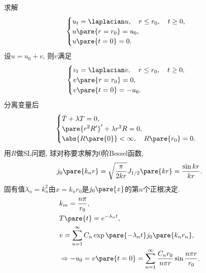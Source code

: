 \documentclass[hidelinks]{ctexart}
\begin{document}
\begin{sample}
    \begin{ex}
        求解
        \[ \begin{cases}
            u_t = \laplacian u,\quad r\le r_0,\quad t\ge 0, \\
            u\pare{r=r_0} = u_0, \\
            u\pare{t=0} = 0.
        \end{cases} \]
        设$u=u_0 + v$, 则$v$满足
        \[ \begin{cases}
            v_t = \laplacian v,\quad r\le r_0,\quad t\ge 0, \\
            v\pare{r=r_0} = 0, \\
            v\pare{t=0} = -u_0.
        \end{cases} \]
        分离变量后
        \[ \begin{cases}
            \dot{T} + \lambda T = 0, \\
            \pare{r^2R'}' + \lambda r^2 R = 0, \\
            \abs{R\pare{0}}<\infty,\quad R\pare{r_0} = 0.
        \end{cases} \]
        用$R$做SL问题, 球对称要求解为$0$阶Bessel函数,
        \[ j_0\pare{k_n r} = \sqrt{\frac{\pi}{2kr}} J_{1/2}\pare{kr} = \frac{\sin kr}{kr}. \]
        固有值$\lambda_n = k_n^2$由$x=k_n r_0$是$j_0\pare{x}$的第$n$个正根决定.
        \begin{align*}
            & k_m = \frac{n\pi}{r_0}, \\
            & T\pare{t} = e^{-\lambda_n t}, \\
            & v = \sum_{n=1}^\infty C_n \exp\pare{-\lambda_n t}j_0\pare{k_n r_n}, \\
            & \Rightarrow -u_0 = v\pare{t=0} = \sum_{n=1}^\infty \frac{C_nr_0}{n\pi r}\sin \frac{n\pi r}{r_0}.
        \end{align*}
    \end{ex}
\end{sample}



\end{document}
